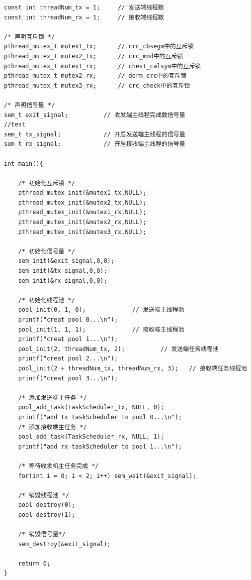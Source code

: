 \documentclass{article}
\begin{document}
\lstset{language=C++}
\begin{lstlisting}
const int threadNum_tx = 1;		// 发送端线程数
const int threadNum_rx = 1;		// 接收端线程数

/* 声明互斥锁 */
pthread_mutex_t mutex1_tx;		// crc_cbsegm中的互斥锁
pthread_mutex_t mutex2_tx;		// crc_mod中的互斥锁
pthread_mutex_t mutex1_rx;		// chest_calsym中的互斥锁
pthread_mutex_t mutex2_rx;		// derm_crc中的互斥锁
pthread_mutex_t mutex3_rx;		// crc_check中的互斥锁

/* 声明信号量 */
sem_t exit_signal;			// 收发端主线程完成数信号量
//test
sem_t tx_signal;			// 开启发送端主线程的信号量
sem_t rx_signal;			// 开启接收端主线程的信号量

int main(){
	
	/* 初始化互斥锁 */
	pthread_mutex_init(&mutex1_tx,NULL);
	pthread_mutex_init(&mutex2_tx,NULL);
	pthread_mutex_init(&mutex1_rx,NULL);
	pthread_mutex_init(&mutex2_rx,NULL);
	pthread_mutex_init(&mutex3_rx,NULL);
	
	/* 初始化信号量 */
	sem_init(&exit_signal,0,0);
	sem_init(&tx_signal,0,0);
	sem_init(&rx_signal,0,0);
	
	/* 初始化线程池 */
	pool_init(0, 1, 0);				// 发送端主线程池
	printf("creat pool 0...\n");
	pool_init(1, 1, 1);				// 接收端主线程池
	printf("creat pool 1...\n");
	pool_init(2, threadNum_tx, 2);			// 发送端任务线程池
	printf("creat pool 2...\n");
	pool_init(2 + threadNum_tx, threadNum_rx, 3);	// 接收端任务线程池
	printf("creat pool 3...\n");
	
	/* 添加发送端主任务 */
	pool_add_task(TaskScheduler_tx, NULL, 0);
	printf("add tx taskScheduler to pool 0...\n");
	/* 添加接收端主任务 */
	pool_add_task(TaskScheduler_rx, NULL, 1);
	printf("add rx taskScheduler to pool 1...\n");

	/* 等待收发机主任务完成 */
	for(int i = 0; i < 2; i++) sem_wait(&exit_signal);

	/* 销毁线程池 */
	pool_destroy(0);
	pool_destroy(1);

	/* 销毁信号量*/
	sem_destroy(&exit_signal);

	return 0;
}
\end{lstlisting}
\end{document}

